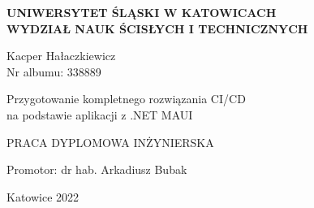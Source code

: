 \renewcommand{\maketitle}{
    \begin{titlepage}
    \begin{center}
        \textbf{UNIWERSYTET ŚLĄSKI W KATOWICACH\\
        WYDZIAŁ NAUK ŚCISŁYCH I TECHNICZNYCH\\
        }

        \vspace{1.5 cm}
        
        \Large 
        Kacper Hałaczkiewicz\\
        Nr albumu: 338889\\
        
        \vspace*{0.5 cm}
        
        Przygotowanie kompletnego rozwiązania CI/CD \\
        na podstawie aplikacji z .NET MAUI
        
        \vspace*{2.0 cm}
    
        \small
        PRACA DYPLOMOWA INŻYNIERSKA\\
        
        \vspace{8.0 cm}
    
        \large
        Promotor: dr hab. Arkadiusz Bubak\\
        
        \vspace{1 cm}
        
        \small 
        Katowice 2022\\
    \end{center}
    \clearpage
    \end{titlepage}
}

\maketitle

